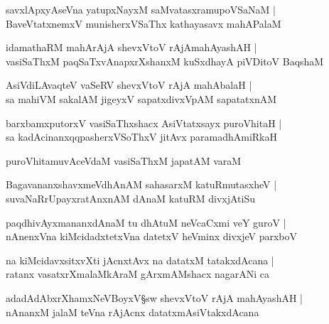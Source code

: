 \begin{shloka}
savxlApxyAseVna yatupxNayxM saMvatasxramupoVSaNaM |\\
BaveVtatxnemxV munisherxVSaThx kathayasavx mahAPalaM 
\end{shloka}

\begin{shloka}
idamathaRM mahArAjA shevxVtoV rAjAmahAyashAH |\\
vasiSaThxM paqSaTxvAnapxrXshanxM kuSxdhayA piVDitoV BaqshaM 
\end{shloka}

\begin{shloka}
AsiVdiLAvaqteV vaSeRV shevxVtoV rAjA mahAbalaH |\\
sa mahiVM sakalAM jigeyxV sapatxdivxVpAM sapatatxnAM
\end{shloka}

\begin{shloka}
barxbamxputorxV vasiSaThxshacx AsiVtatxsayx puroVhitaH |\\
sa kadAcinanxqqpasherxVSoThxV jitAvx paramadhAmiRkaH 
\end{shloka}

\begin{shloka}
puroVhitamuvAceVdaM vasiSaThxM japatAM varaM 
\end{shloka}

\begin{shloka}
BagavananxshavxmeVdhAnAM sahasarxM katuRmutasxheV |\\
suvaNaRrUpayxratAnxnAM dAnaM katuRM divxjAtiSu
\end{shloka}

\begin{shloka}
paqdhivAyxmananxdAnaM tu dhAtuM neVcaCxmi veY guroV |\\
nAnenxVna kiMcidadxtetxVna datetxV heVminx divxjeV parxboV
\end{shloka}

\begin{shloka}
na kiMcidavxsitxvXti jAcnxtAvx na datatxM tatakxdAcana |\\
ratanx vasatxrXmalaMkAraM gArxmAMshacx nagarANi ca 
\end{shloka}

\begin{shloka}
adadAdAbxrXhamxNeVBoyxV\S sw shevxVtoV rAjA mahAyashAH |\\
nAnanxM jalaM teVna rAjAcnx datatxmAsiVtakxdAcana
\end{shloka}

